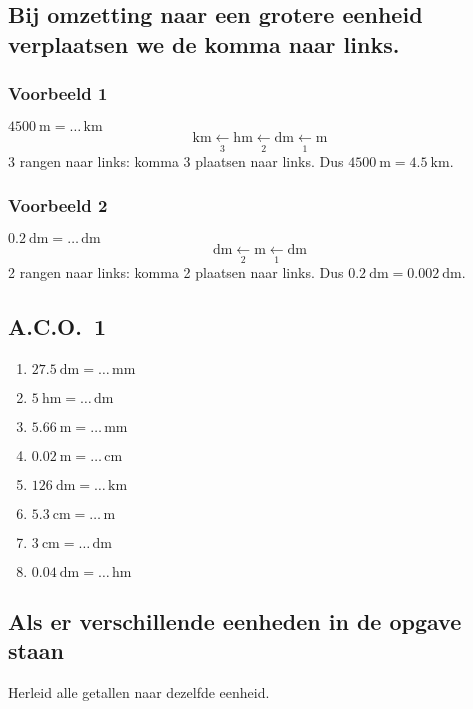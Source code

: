 \documentclass[a4paper,12pt]{article}
\begin{document}
\subsection*{Bij omzetting naar een grotere eenheid verplaatsen we de komma naar links.}

\subsubsection*{Voorbeeld 1}
\(\SI{4500}{\metre}=\ldots\,\si{\kilo\metre}\)
\[
\si{\kilo\metre}\xleftarrow[3]{}\si{\hecto\metre}\xleftarrow[2]{}\si{\deca\metre}\xleftarrow[1]{}\si{\metre}
\]
3 rangen naar links: komma 3 plaatsen naar links. Dus \(\SI{4500}{\metre}=\SI{4.5}{\kilo\metre}\).

\subsubsection*{Voorbeeld 2}
\(\SI{0.2}{\deci\metre}=\ldots\,\si{\deca\metre}\)
\[
\si{\deca\metre}\xleftarrow[2]{}\si{\metre}\xleftarrow[1]{}\si{\deci\metre}
\]
2 rangen naar links: komma 2 plaatsen naar links. Dus \(\SI{0.2}{\deci\metre}=\SI{0.002}{\deca\metre}\).

\subsection*{A.C.O.~1}
\begin{multicols}{2}
\begin{enumerate}
  \item \(\SI{27.5}{\deci\metre}=\ldots\,\si{\milli\metre}\)
  \item \(\SI{5}{\hecto\metre}=\ldots\,\si{\deci\metre}\)
  \item \(\SI{5.66}{\metre}=\ldots\,\si{\milli\metre}\)
  \item \(\SI{0.02}{\metre}=\ldots\,\si{\centi\metre}\)
  \item \(\SI{126}{\deci\metre}=\ldots\,\si{\kilo\metre}\)
  \item \(\SI{5.3}{\centi\metre}=\ldots\,\si{\metre}\)
  \item \(\SI{3}{\centi\metre}=\ldots\,\si{\deca\metre}\)
  \item \(\SI{0.04}{\deca\metre}=\ldots\,\si{\hecto\metre}\)
\end{enumerate}
\end{multicols}


\subsection{Als er verschillende eenheden in de opgave staan}
Herleid alle getallen naar dezelfde eenheid.
\end{document}
